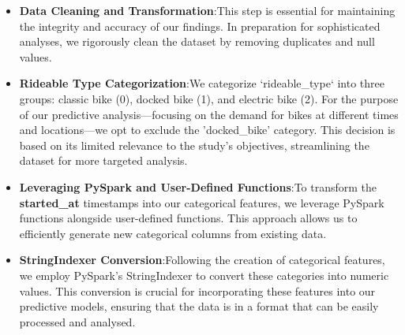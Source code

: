    \begin{itemize}
        \item \textbf{Data Cleaning and Transformation}:\newline This step is essential for maintaining the integrity and accuracy of our findings. In preparation for sophisticated analyses, we rigorously clean the dataset by removing duplicates and null values.
        \item \textbf{Rideable Type Categorization}:\newline We categorize `rideable\_type` into three groups: classic bike (0), docked bike (1), and electric bike (2).
                        For the purpose of our predictive analysis—focusing on the demand for bikes at different times and locations—we opt to exclude the 'docked\_bike' category.
                        This decision is based on its limited relevance to the study's objectives, streamlining the dataset for more targeted analysis.
        \item \textbf{Leveraging PySpark and User-Defined Functions}:\newline To transform the \textbf{started\_at} timestamps into our categorical features, we leverage PySpark functions alongside user-defined functions. This approach allows us to efficiently generate new categorical columns from existing data.
        \item \textbf{StringIndexer Conversion}:\newline Following the creation of categorical features, we employ PySpark's StringIndexer to convert these categories into numeric values. This conversion is crucial for incorporating these features into our predictive models, ensuring that the data is in a format that can be easily processed and analysed.
      \end{itemize}



